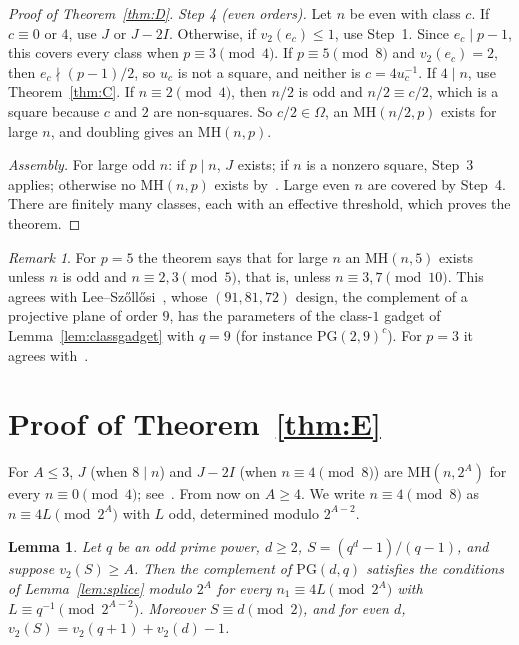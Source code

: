 \documentclass[10pt]{article}
\newtheorem{lemma}{Lemma}
\theoremstyle{remark}
\newtheorem*{remark}{Remark}
\newcommand{\MH}{\mathrm{MH}}
\newcommand{\PG}{\mathrm{PG}}
\begin{document}
\begin{proof}[Proof of Theorem~\ref{thm:D}]
\emph{Step 4 (even orders).} Let $n$ be even with class $c$. If $c\equiv0$ or $4$, use $J$ or $J-2I$. Otherwise, if $v_2(e_c)\le1$, use Step~1. Since $e_c\mid p-1$, this covers every class when $p\equiv3\pmod4$. If $p\equiv5\pmod8$ and $v_2(e_c)=2$, then $e_c\nmid(p-1)/2$, so $u_c$ is not a square, and neither is $c=4u_c^{-1}$. If $4\mid n$, use Theorem~\ref{thm:C}. If $n\equiv2\pmod4$, then $n/2$ is odd and $n/2\equiv c/2$, which is a square because $c$ and $2$ are non-squares. So $c/2\in\Omega$, an $\MH(n/2,p)$ exists for large $n$, and doubling gives an $\MH(n,p)$.

\emph{Assembly.} For large odd $n$: if $p\mid n$, $J$ exists; if $n$ is a nonzero square, Step~3 applies; otherwise no $\MH(n,p)$ exists by~\cite[Lemma~2.2]{K}. Large even $n$ are covered by Step~4. There are finitely many classes, each with an effective threshold, which proves the theorem.
\end{proof}

\begin{remark}
For $p=5$ the theorem says that for large $n$ an $\MH(n,5)$ exists unless $n$ is odd and $n\equiv2,3\pmod5$, that is, unless $n\equiv3,7\pmod{10}$. This agrees with Lee--Sz\H{o}ll\H{o}si~\cite[Theorem~3.10]{LS}, whose $(91,81,72)$ design, the complement of a projective plane of order $9$, has the parameters of the class-$1$ gadget of Lemma~\ref{lem:classgadget} with $q=9$ (for instance $\PG(2,9)^c$). For $p=3$ it agrees with~\cite[Theorem~2.5(b)]{K}.
\end{remark}

\section{Proof of Theorem~\ref{thm:E}}\label{sec:E}
For $A\le3$, $J$ (when $8\mid n$) and $J-2I$ (when $n\equiv4\pmod 8$) are $\MH(n,2^A)$ for every $n\equiv0\pmod4$; see~\cite[Theorem~2.5]{K}. From now on $A\ge4$. We write $n\equiv4\pmod 8$ as $n\equiv 4L\pmod{2^A}$ with $L$ odd, determined modulo $2^{A-2}$.

\begin{lemma}\label{lem:2adic}
Let $q$ be an odd prime power, $d\ge2$, $S=(q^d-1)/(q-1)$, and suppose $v_2(S)\ge A$. Then the complement of $\PG(d,q)$ satisfies the conditions of Lemma~\ref{lem:splice} modulo $2^A$ for every $n_1\equiv4L\pmod{2^A}$ with $L\equiv q^{-1}\pmod{2^{A-2}}$. Moreover $S\equiv d\pmod2$, and for even $d$, $v_2(S)=v_2(q+1)+v_2(d)-1$.
\end{lemma}
\end{document}
